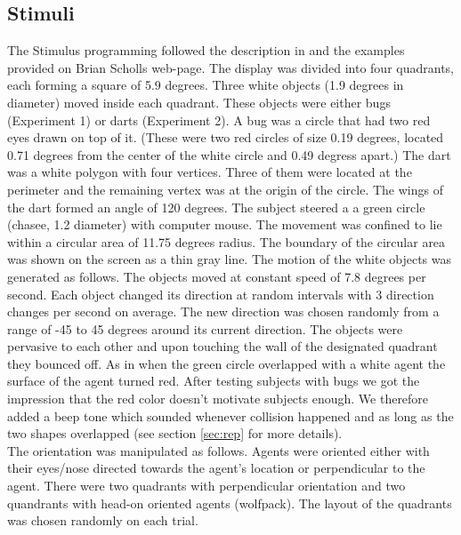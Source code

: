 \documentclass[10pt]{article}
\begin{document}
\subsection*{Stimuli}
The Stimulus programming followed the description in \cite{gao10} and the examples provided on Brian Scholls web-page. 
The display was divided into four quadrants, each forming a square of 5.9 degrees. 
Three white objects (1.9 degrees in diameter) moved inside each quadrant. 
These objects were either bugs (Experiment 1) or darts (Experiment 2). 
A bug was a circle that had two red eyes drawn on top of it. 
(These were two red circles of size 0.19 degrees, located 0.71 degrees from the center of the white circle and 0.49 degress apart.) 
The dart was a white polygon with four vertices. 
Three of them were located at the perimeter and the remaining vertex was at the origin of the circle. 
The wings of the dart formed an angle of 120 degrees.
The subject steered a a green circle (chasee, 1.2 diameter) with computer mouse. 
The movement was confined to lie within a circular area of 11.75 degrees radius. 
The boundary of the circular area was shown on the screen as a thin gray line. 
The motion of the white objects was generated as follows. 
The objects moved at constant speed of 7.8 degrees per second. 
Each object changed its direction at random intervals with 3 direction changes per second on average. 
The new direction was chosen randomly from a range of -45 to 45 degrees around its current direction. 
The objects were pervasive to each other and upon touching the wall of the designated quadrant they bounced off. 
As in \cite{gao10} when the green circle overlapped with a white agent the surface of the agent turned red. 
After testing subjects with bugs we got the impression that the red color doesn't motivate subjects enough. 
We therefore added a beep tone which sounded whenever collision happened and as long as the two shapes overlapped (see section \ref{sec:rep} for more details).\\
The orientation was manipulated as follows. 
Agents were oriented either with their eyes/nose directed towards the agent's location or perpendicular to the agent. 
There were two quadrants with perpendicular orientation and two quandrants with head-on oriented agents (wolfpack). 
The layout of the quadrants was chosen randomly on each trial. \\
\end{document}
